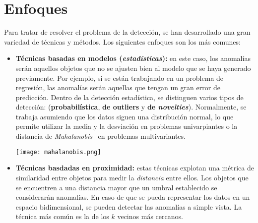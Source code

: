 \section{Enfoques}
Para tratar de resolver el problema de la detección, se han desarrollado una gran variedad de
técnicas y métodos. Los siguientes enfoques son los más comunes:
\begin{itemize}[topsep=0pt]
	\item \textbf{Técnicas basadas en modelos (\textit{estadísticas}):} en este caso, los anomalías serán
		aquellos objetos que no se ajusten bien al modelo que se haya generado previamente. Por ejemplo,
		si se están trabajando en un problema de regresión, las anomalías serán aquellas que tengan un
		gran error de predicción. Dentro de la detección estadística, se distinguen varios tipos de detección:
		(\textbf{probabilística}, \textbf{de outliers} y \textbf{de \textit{novelties}}). Normalmente, se
		trabaja asumiendo que los datos siguen una distribución normal, lo que permite utilizar la media y la
		desviación en problemas univarpiantes o la distancia de \emph{Mahalanobis}~\cite{mahalanobis2018generalized}
		en problemas multivariantes.

		\begin{minipage}{\linewidth}
			\centering
			\texttt{[image: mahalanobis.png]}
			\label{fig:fig2}
		\end{minipage}
	\item \textbf{Técnicas basdadas en proximidad:} estas técnicas explotan una métrica de
		similaridad entre objetos para medir la \textit{distancia} entre ellos. Los objetos que
		se encuentren a una distancia mayor que un umbral establecido se considerarán anomalías.
		En caso de que se pueda representar los datos en un espacio bidimensional, se pueden
		detectar las anomalías a simple vista. La técnica más común es la de los $k$ vecinos más
		cercanos.


\end{itemize}

